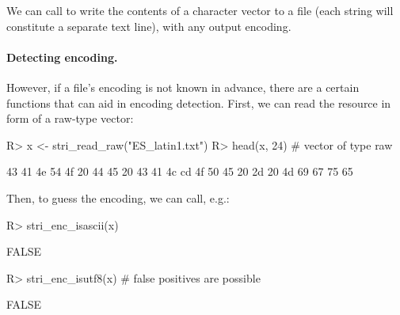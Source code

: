 \documentclass[nojss]{jss}
\begin{document}
We can call  to write the contents
of a character vector to a file (each string will
constitute a separate text line), with any output encoding.




\paragraph{Detecting encoding.}
However, if a file's encoding is not known in advance, there are
a certain functions that can aid in encoding detection.
First, we can read the resource in form of a raw-type vector:

%

\begin{Schunk}
\begin{Sinput}
R> x <- stri_read_raw("ES_latin1.txt")
R> head(x, 24)  # vector of type raw
\end{Sinput}
\begin{Soutput}
 [1] 43 41 4e 54 4f 20 44 45 20 43 41 4c cd 4f 50 45 20 2d 20 4d 69 67 75 65
\end{Soutput}
\end{Schunk}

Then, to guess the encoding, we can call, e.g.:

\begin{Schunk}
\begin{Sinput}
R> stri_enc_isascii(x)
\end{Sinput}
\begin{Soutput}
[1] FALSE
\end{Soutput}
\begin{Sinput}
R> stri_enc_isutf8(x)   # false positives are possible
\end{Sinput}
\begin{Soutput}
[1] FALSE
\end{Soutput}
\end{Schunk}
\end{document}
